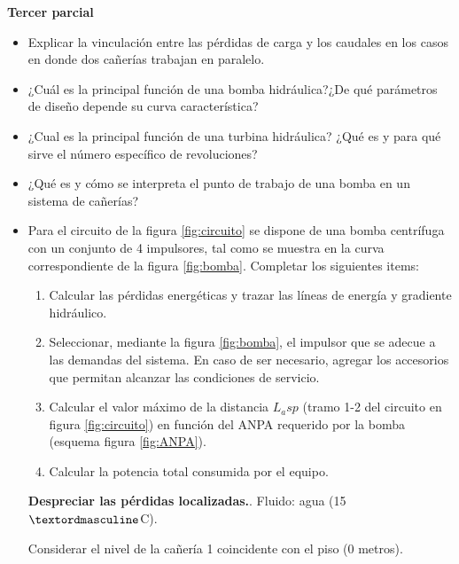 \textbf{Tercer parcial}
\begin{itemize}
 \item Explicar la vinculación entre las pérdidas de carga y los caudales en los casos en donde dos cañerías trabajan en paralelo.


 \item ¿Cuál es la principal función de una bomba hidráulica?¿De qué parámetros de diseño depende su curva característica?
 \item ¿Cual es la principal función de una turbina hidráulica? ¿Qué es y para qué sirve el número específico de revoluciones?
 \item ¿Qué es y cómo se interpreta el punto de trabajo de una bomba en un sistema de cañerías?








 \item Para el circuito de la figura \ref{fig:circuito} se dispone de una bomba centrífuga con un conjunto de 4 impulsores, tal como se  muestra en la curva correspondiente de la figura \ref{fig:bomba}. Completar los siguientes items:
 \begin{enumerate}
  \item Calcular las pérdidas energéticas y trazar las líneas de energía y  gradiente hidráulico.
  \item Seleccionar, mediante la figura \ref{fig:bomba},
  el impulsor que se adecue a las demandas del sistema. En caso de ser necesario, agregar los
  accesorios que permitan alcanzar las condiciones de servicio.
  \item Calcular el valor máximo de la distancia $L_asp$ (tramo 1-2 del circuito en figura \ref{fig:circuito})  en función del ANPA requerido por la bomba (esquema figura \ref{fig:ANPA}).
  \item Calcular la potencia total consumida por el equipo.
 \end{enumerate}

 \textbf{Despreciar las pérdidas localizadas.}. Fluido: agua (15 $\textordmasculine$C).
   
 Considerar el nivel de la cañería 1 coincidente con el piso (0 metros).


\end{itemize}
